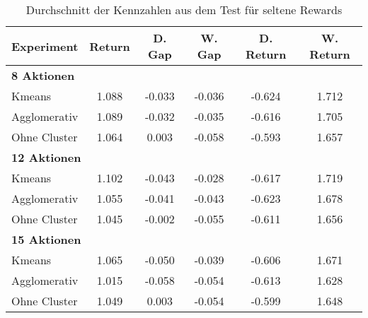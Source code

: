 \begin{table}[ht]
\centering
\caption{Durchschnitt der Kennzahlen aus dem Test für seltene Rewards}
\begin{tabular}{lccccc}
\hline
\textbf{Experiment} & \textbf{Return} & \textbf{D. Gap} & \textbf{W. Gap} & \textbf{D. Return} & \textbf{W. Return} \\
\hline
\multicolumn{6}{l}{\textbf{8 Aktionen}} \\
\hspace{1em}Kmeans & 1.088 & -0.033 & -0.036 & -0.624 & 1.712 \\
\hspace{1em}Agglomerativ & 1.089 & -0.032 & -0.035 & -0.616 & 1.705 \\
\hspace{1em}Ohne Cluster & 1.064 & 0.003 & -0.058 & -0.593 & 1.657 \\
\hline
\multicolumn{6}{l}{\textbf{12 Aktionen}} \\
\hspace{1em}Kmeans & 1.102 & -0.043 & -0.028 & -0.617 & 1.719 \\
\hspace{1em}Agglomerativ & 1.055 & -0.041 & -0.043 & -0.623 & 1.678 \\
\hspace{1em}Ohne Cluster & 1.045 & -0.002 & -0.055 & -0.611 & 1.656 \\
\hline
\multicolumn{6}{l}{\textbf{15 Aktionen}} \\
\hspace{1em}Kmeans & 1.065 & -0.050 & -0.039 & -0.606 & 1.671 \\
\hspace{1em}Agglomerativ & 1.015 & -0.058 & -0.054 & -0.613 & 1.628 \\
\hspace{1em}Ohne Cluster & 1.049 & 0.003 & -0.054 & -0.599 & 1.648 \\
\hline
\end{tabular}
\end{table}
